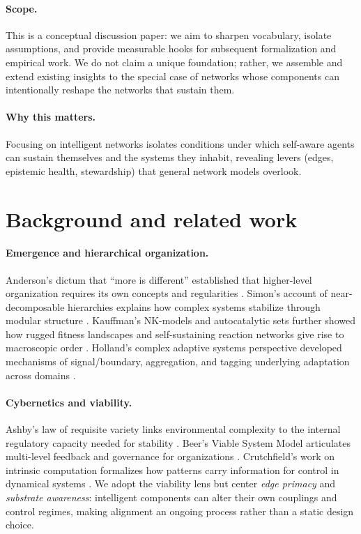 \documentclass[12pt]{article}
\begin{document}
\paragraph{Scope.} This is a conceptual discussion paper: we aim to sharpen vocabulary, isolate assumptions, and provide measurable hooks for subsequent formalization and empirical work. We do not claim a unique foundation; rather, we assemble and extend existing insights to the special case of networks whose components can intentionally reshape the networks that sustain them.

\paragraph{Why this matters.} Focusing on intelligent networks isolates conditions under which self-aware agents can sustain themselves and the systems they inhabit, revealing levers (edges, epistemic health, stewardship) that general network models overlook.
\section{Background and related work}
\paragraph{Emergence and hierarchical organization.}
Anderson’s dictum that ``more is different'' established that higher-level organization requires its own concepts and regularities \citep{Anderson1972}. Simon’s account of near-decomposable hierarchies explains how complex systems stabilize through modular structure \citep{Simon1962}. Kauffman’s NK-models and autocatalytic sets further showed how rugged fitness landscapes and self-sustaining reaction networks give rise to macroscopic order \citep{Kauffman1993}. Holland’s complex adaptive systems perspective developed mechanisms of signal/boundary, aggregation, and tagging underlying adaptation across domains \citep{Holland1992}.

\paragraph{Cybernetics and viability.}
Ashby’s law of requisite variety links environmental complexity to the internal regulatory capacity needed for stability \citep{Ashby1956}. Beer’s Viable System Model articulates multi-level feedback and governance for organizations \citep{Beer1972}. Crutchfield’s work on intrinsic computation formalizes how patterns carry information for control in dynamical systems \citep{Crutchfield1994}. We adopt the viability lens but center \emph{edge primacy} and \emph{substrate awareness}: intelligent components can alter their own couplings and control regimes, making alignment an ongoing process rather than a static design choice.
\end{document}
